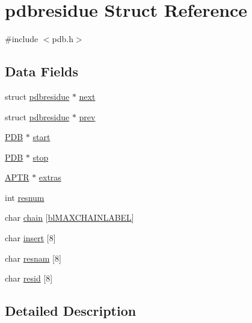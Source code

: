 \hypertarget{structpdbresidue}{\section{pdbresidue Struct Reference}
\label{structpdbresidue}
}


{\ttfamily \#include $<$pdb.\-h$>$}

\subsection*{Data Fields}
\begin{DoxyCompactItemize}
\item 
struct \hyperlink{structpdbresidue}{pdbresidue} $\ast$ \hyperlink{structpdbresidue_a7293abcb107cb64e11e54348b5e31fbd}{next}
\item 
struct \hyperlink{structpdbresidue}{pdbresidue} $\ast$ \hyperlink{structpdbresidue_a8725af2cbb3db5aa9845a23d397baf58}{prev}
\item 
\hyperlink{pdb_8h_aa31eb9fe57a50b29778e64bb131b22bf}{P\-D\-B} $\ast$ \hyperlink{structpdbresidue_af9637d86382b94dc2d5afbf24ecc4a34}{start}
\item 
\hyperlink{pdb_8h_aa31eb9fe57a50b29778e64bb131b22bf}{P\-D\-B} $\ast$ \hyperlink{structpdbresidue_a6d5bcaf01a13f97f8d88c5d489b48fec}{stop}
\item 
\hyperlink{_sys_defs_8h_a201013872f88d6f535b12e644d7f4d5a}{A\-P\-T\-R} $\ast$ \hyperlink{structpdbresidue_aaa357dbbf4b88fcb1df71547b2d085a6}{extras}
\item 
int \hyperlink{structpdbresidue_a7503a437042b8ae030eefb90decd7ceb}{resnum}
\item 
char \hyperlink{structpdbresidue_abe96afafc1017db40e25d4183a058bc5}{chain} \mbox{[}\hyperlink{pdb_8h_a71c7f291062e2d98b987937309365578}{bl\-M\-A\-X\-C\-H\-A\-I\-N\-L\-A\-B\-E\-L}\mbox{]}
\item 
char \hyperlink{structpdbresidue_a8cc72faf0908e6fff29637c614e608ed}{insert} \mbox{[}8\mbox{]}
\item 
char \hyperlink{structpdbresidue_a6f47476bfe0dd0abc0ade4a21127dfc2}{resnam} \mbox{[}8\mbox{]}
\item 
char \hyperlink{structpdbresidue_aeec8f1b013ec1e7156d773d72b3b91fd}{resid} \mbox{[}8\mbox{]}
\end{DoxyCompactItemize}


\subsection{Detailed Description}


